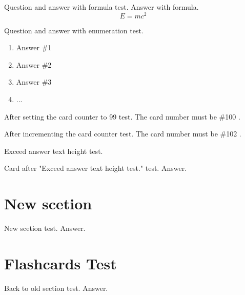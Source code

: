 \documentclass{../flashcards}
\begin{document}
\begin{card}[$$E=mc^2$$]{Question and answer with formula test.}
Answer with formula. $$E=mc^2$$
\end{card}

\begin{card}
{Question and answer with enumeration test.}
\begin{enumerate}
\item Answer \#1
\item Answer \#2
\item Answer \#3
\item ...
\end{enumerate}
\end{card}

\setcounter{card}{99}
\begin{card}{After setting the card counter to 99 test.}
The card number must be \#100 .
\end{card}

\begin{card}{After incrementing the card counter test.}
The card number must be \#102 .
\end{card}

\begin{card}{Exceed answer text height test.}
\footnotesize
\blindtext[4]
\end{card}

\begin{card}{Card after "Exceed answer text height test." test.}
Answer.
\end{card}

\section{New scetion}
\begin{card}{New scetion test.}
Answer.
\end{card}

\section{Flashcards Test}
\begin{card}{Back to old section test.}
Answer.
\end{card}

\listofcard

\printindex
\end{document}
